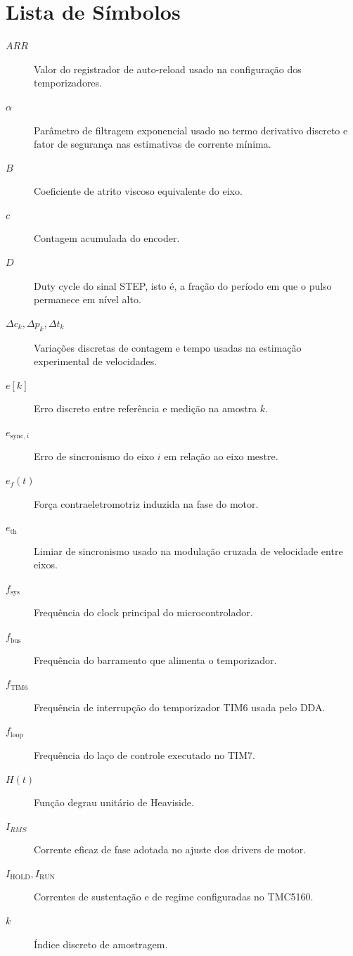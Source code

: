 \chapter*{Lista de Símbolos}

\begin{description}
    \item[$ARR$] \quad Valor do registrador de auto-reload usado na configuração dos temporizadores.
    \item[$\alpha$] \quad Parâmetro de filtragem exponencial usado no termo derivativo discreto e fator de segurança nas estimativas de corrente mínima.
    \item[$B$] \quad Coeficiente de atrito viscoso equivalente do eixo.
    \item[$c$] \quad Contagem acumulada do encoder.
    \item[$D$] \quad Duty cycle do sinal STEP, isto é, a fração do período em que o pulso permanece em nível alto.
    \item[$\Delta c_k, \Delta p_k, \Delta t_k$] \quad Variações discretas de contagem e tempo usadas na estimação experimental de velocidades.
    \item[{$e[k]$}] \quad Erro discreto entre referência e medição na amostra $k$.
    \item[$e_{\text{sync},i}$] \quad Erro de sincronismo do eixo $i$ em relação ao eixo mestre.
    \item[$e_f(t)$] \quad Força contraeletromotriz induzida na fase do motor.
    \item[$e_{\text{th}}$] \quad Limiar de sincronismo usado na modulação cruzada de velocidade entre eixos.
    \item[$f_{\text{sys}}$] \quad Frequência do clock principal do microcontrolador.
    \item[$f_{\text{bus}}$] \quad Frequência do barramento que alimenta o temporizador.
    \item[$f_{\text{TIM6}}$] \quad Frequência de interrupção do temporizador TIM6 usada pelo DDA.
    \item[$f_{\text{loop}}$] \quad Frequência do laço de controle executado no TIM7.
    \item[$H(t)$] \quad Função degrau unitário de Heaviside.
    \item[$I_{RMS}$] \quad Corrente eficaz de fase adotada no ajuste dos drivers de motor.
    \item[$I_{\text{HOLD}}, I_{\text{RUN}}$] \quad Correntes de sustentação e de regime configuradas no TMC5160.
    \item[$k$] \quad Índice discreto de amostragem.

\end{description}
